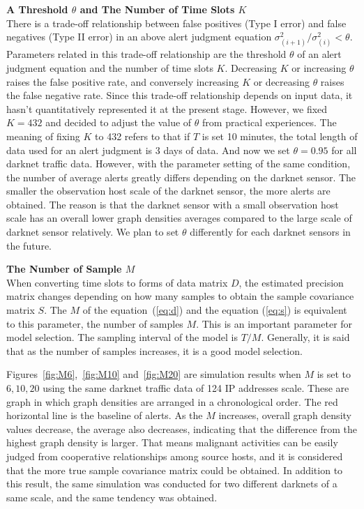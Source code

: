\documentclass{sig-alternate-10pt}
\begin{document}
\vspace*{0.3 cm}
\noindent
\textbf{A Threshold $\theta$ and The Number of Time Slots $K$}\\
There is a trade-off relationship between false positives (Type I error) and false negatives (Type I\hspace{-.1em}I error) in an above alert judgment equation $\sigma^{2}_{(i+1)}/\sigma^{2}_{(i)}<\theta$.
Parameters related in this trade-off relationship are the threshold $\theta$ of an alert judgment equation and the number of time slots $K$.
Decreasing $K$ or increasing $\theta$ raises the false positive rate, and conversely increasing $K$ or decreasing $\theta$ raises the false negative rate.
Since this trade-off relationship depends on input data, it hasn't quantitatively represented it at the present stage.
However, we fixed $K = 432$ and decided to adjust the value of $\theta$ from practical experiences.
The meaning of fixing $K$ to 432 refers to that if $T$ is set 10 minutes, the total length of data used for an alert judgment is 3 days of data.
And now we set $\theta=0.95$ for all darknet traffic data.
However, with the parameter setting of the same condition, the number of average alerts greatly differs depending on the darknet sensor.
The smaller the observation host scale of the darknet sensor, the more alerts are obtained.
The reason is that the darknet sensor with a small observation host scale has an overall lower graph densities averages compared to the large scale of darknet sensor relatively.
We plan to set $\theta$ differently for each darknet sensors in the future.


\vspace*{0.3 cm}
\noindent
\textbf{The Number of Sample $M$}\\
When converting time slots to forms of data matrix $D$, the estimated precision matrix changes depending on how many samples to obtain the sample covariance matrix $S$.
The $M$ of the equation~(\ref{eq:d}) and the equation (\ref{eq:s}) is equivalent to this parameter, the number of samples $M$.
This is an important parameter for model selection.
The sampling interval of the model is $T/M$.
Generally, it is said that as the number of samples increases, it is a good model selection.

Figures~\ref{fig:M6},~\ref{fig:M10} and~\ref{fig:M20} are simulation results when $M$ is set to $6, 10, 20$ using the same darknet traffic data of 124 IP addresses scale.
These are graph in which graph densities are arranged in a chronological order.
The red horizontal line is the baseline of alerts.
As the $M$ increases, overall graph density values decrease, the average also decreases, indicating that the difference from the highest graph density is larger.
That means malignant activities can be easily judged from cooperative relationships among source hosts, and it is considered that the more true sample covariance matrix could be obtained.
In addition to this result, the same simulation was conducted for two different darknets of a same scale, and the same tendency was obtained.
\end{document}
